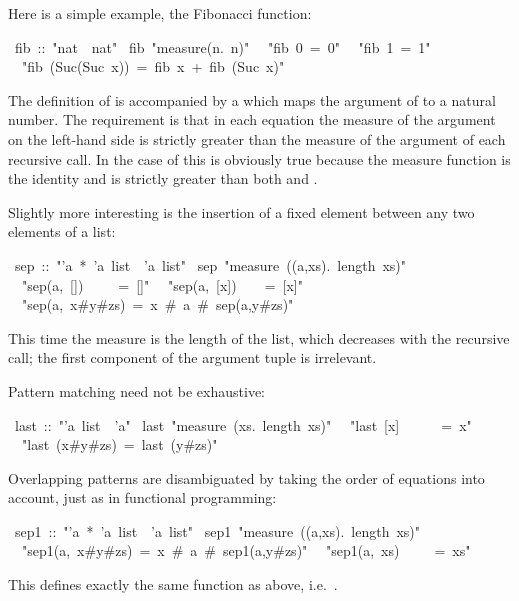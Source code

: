 \begin{isabelle}%
%
\begin{isamarkuptext}%
Here is a simple example, the Fibonacci function:%
\end{isamarkuptext}%
\ fib\ ::\ {"}nat\ {\isasymRightarrow}\ nat{"}\isanewline
{}\ fib\ {"}measure({\isasymlambda}n.\ n){"}\isanewline
\ \ {"}fib\ 0\ =\ 0{"}\isanewline
\ \ {"}fib\ 1\ =\ 1{"}\isanewline
\ \ {"}fib\ (Suc(Suc\ x))\ =\ fib\ x\ +\ fib\ (Suc\ x){"}%
\begin{isamarkuptext}%
\noindent
The definition of  is accompanied by a 
 which maps the argument of  to a
natural number. The requirement is that in each equation the measure of the
argument on the left-hand side is strictly greater than the measure of the
argument of each recursive call. In the case of  this is
obviously true because the measure function is the identity and
 is strictly greater than both  and
.

Slightly more interesting is the insertion of a fixed element
between any two elements of a list:%
\end{isamarkuptext}%
\ sep\ ::\ {"}'a\ *\ 'a\ list\ {\isasymRightarrow}\ 'a\ list{"}\isanewline
{}\ sep\ {"}measure\ ({\isasymlambda}(a,xs).\ length\ xs){"}\isanewline
\ \ {"}sep(a,\ [])\ \ \ \ \ =\ []{"}\isanewline
\ \ {"}sep(a,\ [x])\ \ \ \ =\ [x]{"}\isanewline
\ \ {"}sep(a,\ x\#y\#zs)\ =\ x\ \#\ a\ \#\ sep(a,y\#zs){"}%
\begin{isamarkuptext}%
\noindent
This time the measure is the length of the list, which decreases with the
recursive call; the first component of the argument tuple is irrelevant.

Pattern matching need not be exhaustive:%
\end{isamarkuptext}%
\ last\ ::\ {"}'a\ list\ {\isasymRightarrow}\ 'a{"}\isanewline
{}\ last\ {"}measure\ ({\isasymlambda}xs.\ length\ xs){"}\isanewline
\ \ {"}last\ [x]\ \ \ \ \ \ =\ x{"}\isanewline
\ \ {"}last\ (x\#y\#zs)\ =\ last\ (y\#zs){"}%
\begin{isamarkuptext}%
Overlapping patterns are disambiguated by taking the order of equations into
account, just as in functional programming:%
\end{isamarkuptext}%
\ sep1\ ::\ {"}'a\ *\ 'a\ list\ {\isasymRightarrow}\ 'a\ list{"}\isanewline
{}\ sep1\ {"}measure\ ({\isasymlambda}(a,xs).\ length\ xs){"}\isanewline
\ \ {"}sep1(a,\ x\#y\#zs)\ =\ x\ \#\ a\ \#\ sep1(a,y\#zs){"}\isanewline
\ \ {"}sep1(a,\ xs)\ \ \ \ \ =\ xs{"}%
\begin{isamarkuptext}%
\noindent
This defines exactly the same function as  above, i.e.\
.


\end{isamarkuptext}
\end{isabelle}
